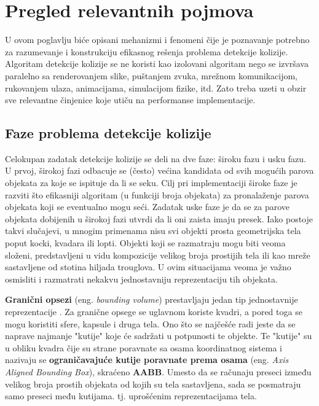 \documentclass[12pt,oneside]{memoir}
\begin{document}
\chapter{Pregled relevantnih pojmova}
\label{sec:karakteristike}

U ovom poglavlju biće opisani mehanizmi i fenomeni čije je poznavanje potrebno za razumevanje i konstrukciju 
efikasnog rešenja problema detekcije kolizije.
Algoritam detekcije kolizije se ne koristi kao izolovani algoritam nego se izvršava paralelno sa renderovanjem slike,
puštanjem zvuka, mrežnom komunikacijom, rukovanjem ulaza, animacijama, simulacijom fizike, itd. 
Zato treba uzeti u obzir sve relevantne činjenice koje utiču na performanse implementacije.

\section{Faze problema detekcije kolizije}

Celokupan zadatak detekcije kolizije se deli na dve faze: široku fazu i usku fazu. 
U prvoj, širokoj fazi
odbacuje se (često) većina kandidata od svih mogućih parova objekata za koje se ispituje da li se seku.
Cilj pri implementaciji široke faze je razviti što efikasniji algoritam (u funkciji broja objekata) 
za pronalaženje parova objekata koji se eventualno mogu seći.
Zadatak uske faze je da se za parove objekata dobijenih u širokoj fazi utvrdi da li oni zaista imaju presek.
Iako postoje takvi slučajevi, u mnogim primenama nisu svi objekti prosta geometrijska tela poput kocki, kvadara ili lopti.
Objekti koji se razmatraju mogu biti veoma složeni, predstavljeni u vidu kompozicije velikog broja prostijih tela ili kao mreže sastavljene od stotina hiljada trouglova.
U ovim situacijama veoma je važno osmisliti i razmatrati nekakvu jednostavniju reprezentaciju tih objekata.

\textbf{Granični opsezi} (eng. {\em bounding volume}) prestavljaju jedan tip jednostavnije reprezentacije \cite{rgpdf}.
Za granične opsege se uglavnom koriste kvadri, a pored toga se mogu koristiti sfere, kapsule i druga tela.
Ono što se najčešće radi jeste da se naprave najmanje "kutije" koje će sadržati u potpunosti te objekte.
Te "kutije" su u obliku kvadra čije su strane poravnate sa osama koordinatnog sistema i nazivaju se
\textbf{ograničavajuće kutije poravnate prema osama} (eng. {\em Axis Aligned Bounding Box}), skraćeno \textbf{AABB}.
Umesto da se računaju preseci između velikog broja prostih objekata od kojih su tela sastavljena, sada se posmatraju 
samo preseci među kutijama. tj. uprošćenim reprezentacijama tela.
\end{document}
